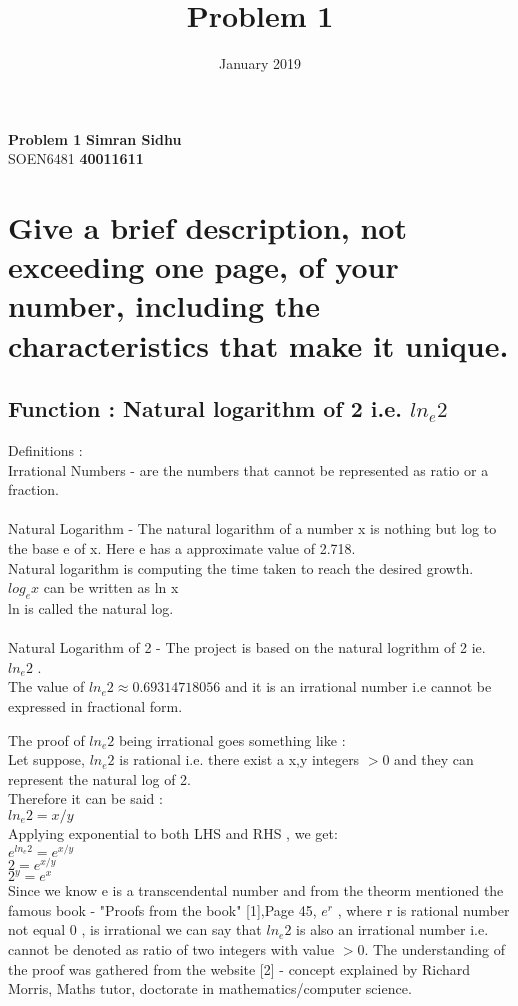 \documentclass{article}
\title{Problem 1}
\date{January 2019}
\begin{document}
\noindent
\large\textbf{Problem 1} \hfill \textbf{Simran Sidhu} \\
\normalsize SOEN6481 \hfill \textbf{40011611} \\
\section{Give a brief description, not exceeding one page, of your number, including the
characteristics that make it unique.}
\subsection*{Function :  Natural logarithm of 2 i.e. $ln_e{2}$}
Definitions :\\
Irrational Numbers - are the numbers that cannot be represented as ratio or a fraction.\\\\
Natural Logarithm -  The natural logarithm of a number x is nothing but log to the base e of x. Here  e has a approximate value of 2.718.\\
Natural logarithm is computing the time taken to reach the desired growth.\\
$log_e{x}$ can be written as ln x\\
 ln is called the natural log.\\\\
Natural Logarithm of 2 - The project is based on the natural logrithm of 2 ie. $ln_e{2}$ . \\
The value of $ln_e{2} \approx 0.69314718056$ and it is an irrational number i.e cannot be expressed in fractional form.

The proof of $ln_e{2}$ being irrational goes something like :\\
Let suppose, $ln_e{2}$ is rational i.e. there exist a x,y integers  $>0$ and they can represent the natural log of 2.\\
Therefore it can be said :\\ 
$ln_e{2}=x/y$\\
Applying exponential to both LHS and RHS , we get:\\
$e^{ln_e{2}}=e^{x / y}$\\
$2=e^{x / y}$\\
$2^y=e^{x}$\\

Since we know e is a transcendental number and from the theorm mentioned the famous book - "Proofs from the book" [1],Page 45, $e^r$ , where r is rational number not equal 0 , is irrational we can say that $ln_e{2}$ is also an irrational number i.e. cannot be denoted as ratio of two integers with value $>0$. The understanding of the proof was gathered from the website [2] - concept explained by Richard Morris, Maths tutor, doctorate in mathematics/computer science.
\end{document}
